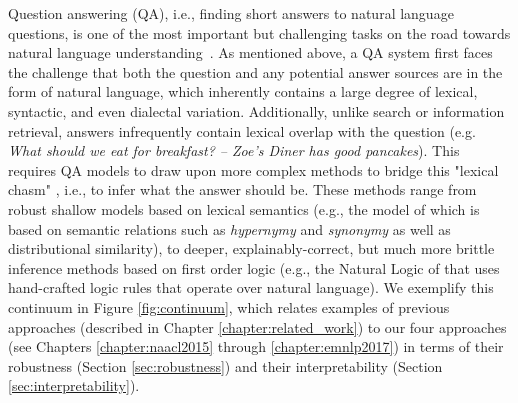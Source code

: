 Question answering (QA), i.e., finding short answers to natural language questions, is one of the most important but challenging 
tasks on the road towards natural language understanding~\citep{Etzioni:11}. 
As mentioned above, a QA system first faces the challenge that both the question and any potential answer sources are in the form of natural language, which inherently contains a large degree of lexical, syntactic, and even dialectal variation.
Additionally, unlike search or information retrieval, answers infrequently contain lexical overlap with the question (e.g. {\em What should we eat for breakfast? -- Zoe's Diner has good pancakes}).  This requires QA models to draw upon more complex methods to bridge this "lexical chasm" \citep{Berger:00}, i.e., to infer what the answer should be.  These methods range from robust shallow models based on lexical semantics (e.g., the model of \citet{yih13} which is based on semantic relations such as \textit{hypernymy} and \textit{synonymy} as well as distributional similarity), to deeper, explainably-correct, but much more brittle inference methods based on first order logic (e.g., the Natural Logic of \citet{maccartney2009natural} that uses hand-crafted logic rules that operate over natural language).  We exemplify this continuum in Figure \ref{fig:continuum}, which relates examples of previous approaches (described in Chapter \ref{chapter:related_work}) to our four approaches (see Chapters \ref{chapter:naacl2015} through \ref{chapter:emnlp2017}) in terms of their robustness (Section \ref{sec:robustness}) and their interpretability (Section \ref{sec:interpretability}).  


